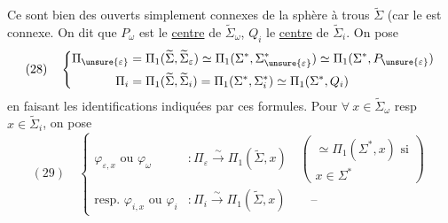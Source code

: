 Ce sont bien des ouverts  simplement connexes de la sphère à trous $\widetilde\Sigma$ (car le   est connexe. On dit que $P_\omega$ est le \uline{centre} de $\widetilde\Sigma_\omega$, $Q_i$ le \uline{centre} de $\widetilde\Sigma_i$.
On pose
\[
(28)\quad\left\{\begin{aligned}
\Pi_{\unsure{\varepsilon}}&=\Pi_1(\widetilde\Sigma,\widetilde\Sigma_\varepsilon)\simeq\Pi_1(\Sigma^*,\Sigma_{\unsure{\varepsilon}}^*)\simeq\Pi_1(\Sigma^*,P_{\unsure{\varepsilon}})\\
\Pi_i&=\Pi_1(\widetilde\Sigma,\widetilde\Sigma_i)=\Pi_1(\Sigma^*,\Sigma_i^*)\simeq\Pi_1(\Sigma^*,Q_i)
\end{aligned}\right.
\]
en faisant les identifications indiquées par ces formules.  Pour $\forall\ x\in\widetilde\Sigma_\omega$ resp $x\in\widetilde\Sigma_i$, on pose
\[
(29)\quad\left\{\begin{aligned}
\varphi_{\varepsilon,x}\text{ ou }\varphi_\omega&:\Pi_\varepsilon\xrightarrow{\sim}\Pi_1(\widetilde\Sigma,x)\quad\left(\begin{gathered}\simeq\Pi_1(\Sigma^*,x)\text{ si}\\x\in\Sigma^*\end{gathered}\right)\\
\text{resp. }\varphi_{i,x}\text{ ou }\varphi_i&:\Pi_i\xrightarrow{\sim}\Pi_1(\widetilde\Sigma,x)\qquad\text{--}
\end{aligned}\right.
\]
